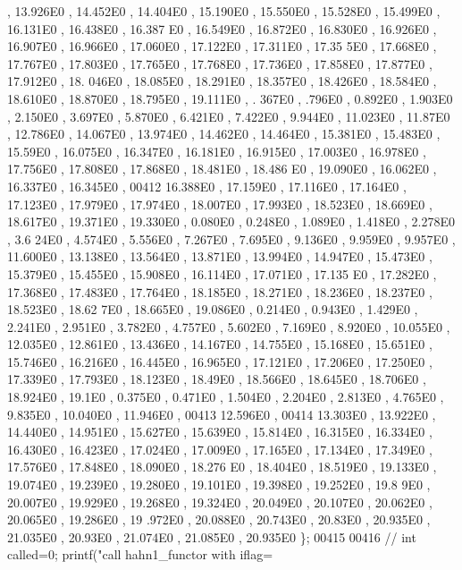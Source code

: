 \begin{DoxyCode}
      , 13.926E0 , 14.452E0 , 14.404E0 , 15.190E0 , 15.550E0 , 15.528E0 , 15.499E0 , 16.131E0 , 16.438E0 , 16.387
      E0 , 16.549E0 , 16.872E0 , 16.830E0 , 16.926E0 , 16.907E0 , 16.966E0 , 17.060E0 , 17.122E0 , 17.311E0 , 17.35
      5E0 , 17.668E0 , 17.767E0 , 17.803E0 , 17.765E0 , 17.768E0 , 17.736E0 , 17.858E0 , 17.877E0 , 17.912E0 , 18.
      046E0 , 18.085E0 , 18.291E0 , 18.357E0 , 18.426E0 , 18.584E0 , 18.610E0 , 18.870E0 , 18.795E0 , 19.111E0 , .
      367E0 , .796E0 , 0.892E0 , 1.903E0 , 2.150E0 , 3.697E0 , 5.870E0 , 6.421E0 , 7.422E0 , 9.944E0 , 11.023E0 , 
      11.87E0  , 12.786E0 , 14.067E0 , 13.974E0 , 14.462E0 , 14.464E0 , 15.381E0 , 15.483E0 , 15.59E0  , 16.075E0 
      , 16.347E0 , 16.181E0 , 16.915E0 , 17.003E0 , 16.978E0 , 17.756E0 , 17.808E0 , 17.868E0 , 18.481E0 , 18.486
      E0 , 19.090E0 , 16.062E0 , 16.337E0 , 16.345E0 ,
00412         16.388E0 , 17.159E0 , 17.116E0 , 17.164E0 , 17.123E0 , 17.979E0 , 17.974E0 , 18.007E0 , 17.993E0 , 
      18.523E0 , 18.669E0 , 18.617E0 , 19.371E0 , 19.330E0 , 0.080E0 , 0.248E0 , 1.089E0 , 1.418E0 , 2.278E0 , 3.6
      24E0 , 4.574E0 , 5.556E0 , 7.267E0 , 7.695E0 , 9.136E0 , 9.959E0 , 9.957E0 , 11.600E0 , 13.138E0 , 13.564E0 
      , 13.871E0 , 13.994E0 , 14.947E0 , 15.473E0 , 15.379E0 , 15.455E0 , 15.908E0 , 16.114E0 , 17.071E0 , 17.135
      E0 , 17.282E0 , 17.368E0 , 17.483E0 , 17.764E0 , 18.185E0 , 18.271E0 , 18.236E0 , 18.237E0 , 18.523E0 , 18.62
      7E0 , 18.665E0 , 19.086E0 , 0.214E0 , 0.943E0 , 1.429E0 , 2.241E0 , 2.951E0 , 3.782E0 , 4.757E0 , 5.602E0 , 
      7.169E0 , 8.920E0 , 10.055E0 , 12.035E0 , 12.861E0 , 13.436E0 , 14.167E0 , 14.755E0 , 15.168E0 , 15.651E0 , 
      15.746E0 , 16.216E0 , 16.445E0 , 16.965E0 , 17.121E0 , 17.206E0 , 17.250E0 , 17.339E0 , 17.793E0 , 18.123E0 
      , 18.49E0  , 18.566E0 , 18.645E0 , 18.706E0 , 18.924E0 , 19.1E0   , 0.375E0 , 0.471E0 , 1.504E0 , 2.204E0 , 
      2.813E0 , 4.765E0 , 9.835E0 , 10.040E0 , 11.946E0 , 
00413 12.596E0 , 
00414 13.303E0 , 13.922E0 , 14.440E0 , 14.951E0 , 15.627E0 , 15.639E0 , 15.814E0 , 16.315E0 , 16.334E0 , 16.430E0
       , 16.423E0 , 17.024E0 , 17.009E0 , 17.165E0 , 17.134E0 , 17.349E0 , 17.576E0 , 17.848E0 , 18.090E0 , 18.276
      E0 , 18.404E0 , 18.519E0 , 19.133E0 , 19.074E0 , 19.239E0 , 19.280E0 , 19.101E0 , 19.398E0 , 19.252E0 , 19.8
      9E0  , 20.007E0 , 19.929E0 , 19.268E0 , 19.324E0 , 20.049E0 , 20.107E0 , 20.062E0 , 20.065E0 , 19.286E0 , 19
      .972E0 , 20.088E0 , 20.743E0 , 20.83E0  , 20.935E0 , 21.035E0 , 20.93E0  , 21.074E0 , 21.085E0 , 20.935E0 \};
00415 
00416         \textcolor{comment}{//        int called=0; printf("call hahn1\_functor with  iflag=%
}
\end{DoxyCode}
